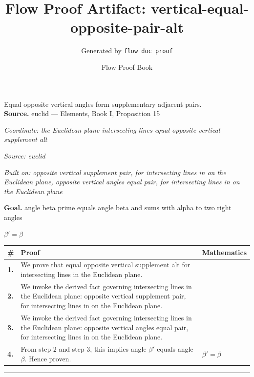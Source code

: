 \documentclass[11pt]{article}
\title{Flow Proof Artifact: vertical-equal-opposite-pair-alt}
\author{Generated by \texttt{flow doc proof}}
\date{Flow Proof Book}
\theoremstyle{definition}
\begin{document}
\maketitle
Equal opposite vertical angles form supplementary adjacent pairs.\\[0.5em]
\textbf{Source.} euclid — Elements, Book I, Proposition 15\\[0.5em]
\bigskip
{}\par
\smallskip\noindent\textit{Coordinate: the Euclidean plane \cdot intersecting lines \cdot equal opposite vertical supplement alt}\par
\smallskip\noindent\textit{Source: euclid}\par
\smallskip\noindent\textit{Built on: opposite vertical supplement pair, for intersecting lines in on the Euclidean plane, opposite vertical angles equal pair, for intersecting lines in on the Euclidean plane}\par
\medskip
\noindent\textbf{Goal.} angle beta prime equals angle beta and sums with alpha to two right angles\par
\noindent$\displaystyle \beta' = \beta$\par
\medskip
\noindent
\begin{tabular}{@{} >{\raggedright\arraybackslash}p{} >{\raggedright\arraybackslash}p{} >{\raggedleft\arraybackslash}p{} @{}}
\textbf{\#} & \textbf{Proof} & \textbf{Mathematics} \\
\midrule
\textbf{1.} & We prove that equal opposite vertical supplement alt for intersecting lines in the Euclidean plane. & \\[0.45em]
\textbf{2.} & We invoke the derived fact governing intersecting lines in the Euclidean plane: opposite vertical supplement pair, for intersecting lines in on the Euclidean plane. & \\[0.45em]
\textbf{3.} & We invoke the derived fact governing intersecting lines in the Euclidean plane: opposite vertical angles equal pair, for intersecting lines in on the Euclidean plane. & \\[0.45em]
\textbf{4.} & From step 2 and step 3, this implies angle $\beta$$'$ equals angle $\beta$. Hence proven. & $\displaystyle \beta' = \beta$ \\[0.45em]
\bottomrule
\end{tabular}
\label{thm:Geometry-intersecting lines-equal_opposite_vertical_supplement_alt}
\par\medskip\hrule
\end{document}
